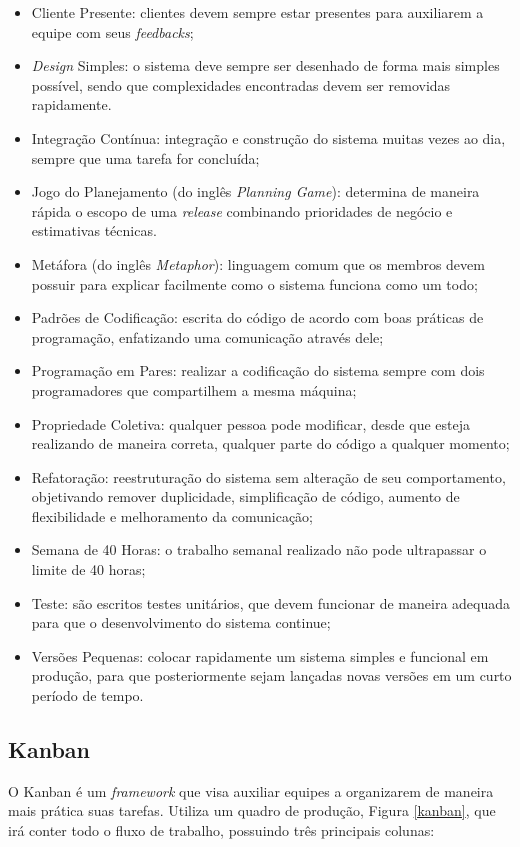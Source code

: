     \begin{itemize}
        \item Cliente Presente: clientes devem sempre estar presentes para auxiliarem a equipe com seus \textit{feedbacks};
        \item \textit{Design} Simples: o sistema deve sempre ser desenhado de forma mais simples possível, sendo que complexidades encontradas devem ser removidas rapidamente.
        \item Integração Contínua: integração e construção do sistema muitas vezes ao dia, sempre que uma tarefa
        for concluída;
        \item Jogo do Planejamento (do inglês \textit{Planning Game}): determina de maneira rápida o escopo de uma \textit{release} combinando prioridades de negócio e estimativas técnicas.
        \item Metáfora (do inglês \textit{Metaphor}): linguagem comum que os membros devem possuir para explicar facilmente como o sistema funciona como um todo;
        \item Padrões de Codificação: escrita do código de acordo com boas práticas de programação, enfatizando uma comunicação através dele;
        \item Programação em Pares: realizar a codificação do sistema sempre
        com dois programadores que compartilhem a mesma máquina;
        \item Propriedade Coletiva: qualquer pessoa pode modificar, desde que esteja realizando de maneira correta, qualquer parte do código a qualquer momento;
        \item Refatoração: reestruturação do sistema sem alteração de seu comportamento, objetivando
        remover duplicidade, simplificação de código, aumento de flexibilidade e melhoramento da comunicação;
        \item Semana de 40 Horas: o trabalho semanal realizado não pode ultrapassar o limite de 40 horas;
        \item Teste: são escritos testes unitários, que devem funcionar de maneira adequada para que
        o desenvolvimento do sistema continue;
        \item Versões Pequenas: colocar rapidamente um sistema simples e funcional em produção, para que posteriormente sejam lançadas novas versões em um curto período de tempo.
    \end{itemize}

    \subsection{Kanban}
    O Kanban \cite{radigan_2015} é um \textit{framework} que visa auxiliar equipes a organizarem de maneira mais prática suas tarefas. Utiliza um quadro de produção, Figura \ref{kanban}, que irá conter todo o fluxo de trabalho, possuindo três principais colunas:

